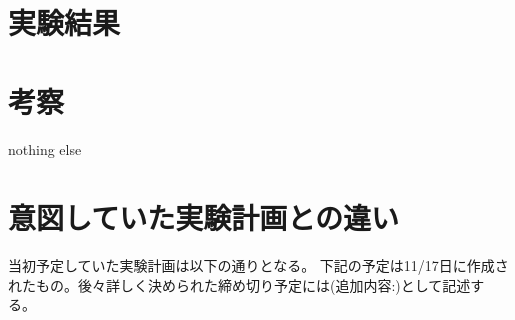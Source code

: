 \documentclass[a4paper, 11pt, titlepage]{jsarticle}
\begin{document}
\newpage
\section{実験結果}%


\section{考察}
nothing else

\section{意図していた実験計画との違い}

当初予定していた実験計画は以下の通りとなる。
下記の予定は11/17日に作成されたもの。後々詳しく決められた締め切り予定には(追加内容:)として記述する。%
\end{document}
